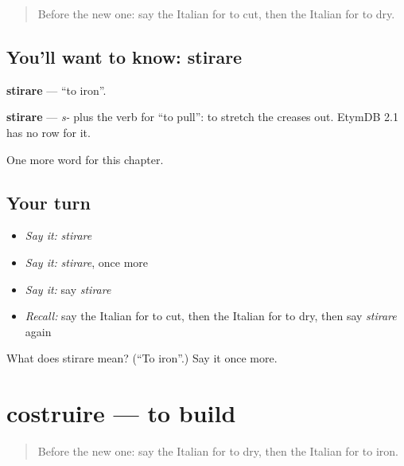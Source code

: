\label{lesson:IT-C233-stirare}



\begin{quote}
Before the new one: say the Italian for to cut, then the Italian for to dry.
\end{quote}

\subsection*{You'll want to know: stirare}
\textbf{stirare} — \textquotedblleft{}to iron\textquotedblright{}.

\begin{cousinweb}
\textbf{stirare} — \emph{s-} plus the verb for \textquotedblleft{}to pull\textquotedblright{}: to stretch the creases out. EtymDB 2.1 has no row for it.
\end{cousinweb}

\begin{grammarlens}[title={What you've built}]
One more word for this chapter.
\end{grammarlens}

\subsection*{Your turn}
\begin{itemize}
\raggedright
  \item \emph{Say it:} \emph{stirare}
  \item \emph{Say it:} \emph{stirare}, once more
  \item \emph{Say it:} say \emph{stirare}
  \item \emph{Recall:} say the Italian for to cut, then the Italian for to dry, then say \emph{stirare} again
\end{itemize}

\begin{tcolorbox}[breakable,colback=teal!4,colframe=teal!35!black,title={Before you move on}]
What does stirare mean? (\textquotedblleft{}To iron\textquotedblright{}.) Say it once more.
\end{tcolorbox}
\section[costruire]{costruire — to build}

\label{lesson:IT-C233-costruire}



\begin{quote}
Before the new one: say the Italian for to dry, then the Italian for to iron.
\end{quote}

